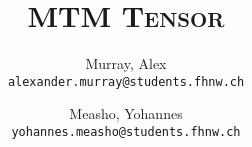 \author{%
    Murray, Alex\\
    \texttt{alexander.murray@students.fhnw.ch}
    \and
    Measho, Yohannes\\
    \texttt{yohannes.measho@students.fhnw.ch}
}

\title{
    \vspace{20mm}
    \Huge{\textsc{MTM Tensor}}
}
